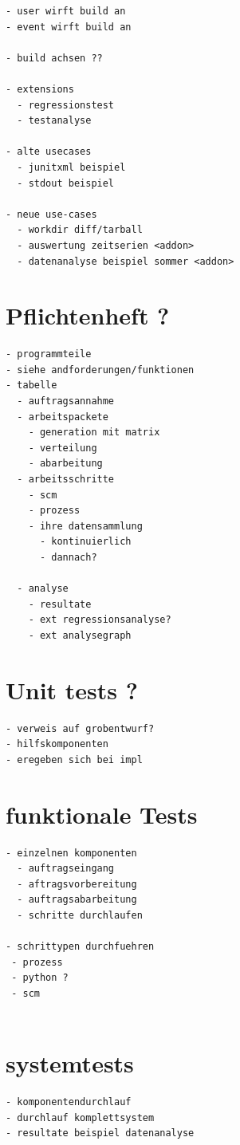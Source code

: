 \begin{verbatim}
- user wirft build an
- event wirft build an

- build achsen ??

- extensions
  - regressionstest
  - testanalyse

- alte usecases
  - junitxml beispiel
  - stdout beispiel

- neue use-cases
  - workdir diff/tarball
  - auswertung zeitserien <addon>
  - datenanalyse beispiel sommer <addon>
\end{verbatim}

\section{Pflichtenheft ?}

\begin{verbatim}
- programmteile
- siehe andforderungen/funktionen
- tabelle
  - auftragsannahme
  - arbeitspackete
    - generation mit matrix
    - verteilung
    - abarbeitung
  - arbeitsschritte
    - scm
    - prozess
    - ihre datensammlung
      - kontinuierlich
      - dannach?

  - analyse
    - resultate
    - ext regressionsanalyse?
    - ext analysegraph
\end{verbatim}

\section{Unit tests ?}


\begin{verbatim}
- verweis auf grobentwurf?
- hilfskomponenten
- eregeben sich bei impl
\end{verbatim}

\section{funktionale Tests}

\begin{verbatim}
- einzelnen komponenten
  - auftragseingang
  - aftragsvorbereitung
  - auftragsabarbeitung
  - schritte durchlaufen

- schrittypen durchfuehren
 - prozess
 - python ?
 - scm


\end{verbatim}

\section{systemtests}

\begin{verbatim}
- komponentendurchlauf
- durchlauf komplettsystem
- resultate beispiel datenanalyse

\end{verbatim}

